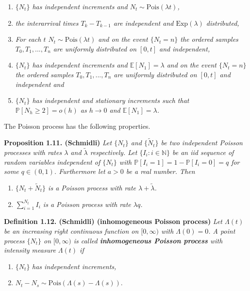 \documentclass[a4paper,12pt,openany]{book}
\providecommand{\tightlist}{%
 \setlength{\itemsep}{0pt}\setlength{\parskip}{0pt}}
\begin{document}
\begin{enumerate}
\def\labelenumi{\roman{enumi})}
\tightlist
\item
  \emph{\(\{N_t\}\) has independent increments and \(N_t\sim \text{Pois}(\lambda t)\),}
\item
  \emph{the interarrival times \(T_k-T_{k-1}\) are independent and \(\text{Exp}(\lambda)\) distributed,}
\item
  \emph{For each \(t\) \(N_t\sim \text{Pois}(\lambda t)\) and on the event \(\{N_t=n\}\) the ordered samples \(T_0,T_1,...,T_n\) are uniformly distributed on \([0,t]\) and independent,}
\item
  \emph{\(\{N_t\}\) has independent increments and \(\mathbb E[N_1]=\lambda\) and on the event \(\{N_t=n\}\) the ordered samples \(T_0,T_1,...,T_n\) are uniformly distributed on \([0,t]\) and independent and}
\item
  \emph{\(\{N_t\}\) has independent and stationary increments such that \(\mathbb P[N_h\ge 2]=o(h)\) as \(h\to 0\) and \(\mathbb E[N_1]=\lambda\).}
\end{enumerate}

The Poisson process has the following properties.

\textbf{Proposition 1.11. (Schmidli)} \emph{Let \(\{N_t\}\) and \(\{\tilde N_t\}\) be two independent Poisson processes with rates \(\lambda\) and \(\tilde\lambda\) respectively. Let \(\{I_i : i \in \mathbb N\}\) be an iid sequence of random variables independent of \(\{N_t\}\) with \(\mathbb P[I_i = 1] = 1−\mathbb P[I_i = 0] = q\) for some \(q \in (0,1)\). Furthermore let \(a > 0\) be a real number. Then}

\begin{enumerate}
\def\labelenumi{\roman{enumi})}
\tightlist
\item
  \emph{\(\{N_t+\tilde N_t\}\) is a Poisson process with rate \(\lambda +\tilde \lambda\).}
\item
  \emph{\(\sum_{i=1}^{N_t}I_i\) is a Poisson process with rate \(\lambda q\).}
\end{enumerate}

\textbf{Definition 1.12. (Schmidli) (inhomogeneous Poisson process)} \emph{Let \(\Lambda(t)\) be an increasing right continuous function on \([0,\infty)\) with \(\Lambda(0) = 0\). A point process \(\{N_t\}\) on \([0, \infty)\) is called \textbf{inhomogeneous Poisson process} with intensity measure \(\Lambda(t)\) if}

\begin{enumerate}
\def\labelenumi{\roman{enumi})}
\tightlist
\item
  \(\{N_t\}\) \emph{has independent increments,}
\item
  \(N_t-N_s\sim\text{Pois}(\Lambda (s)-\Lambda(s))\).
\end{enumerate}
\end{document}
